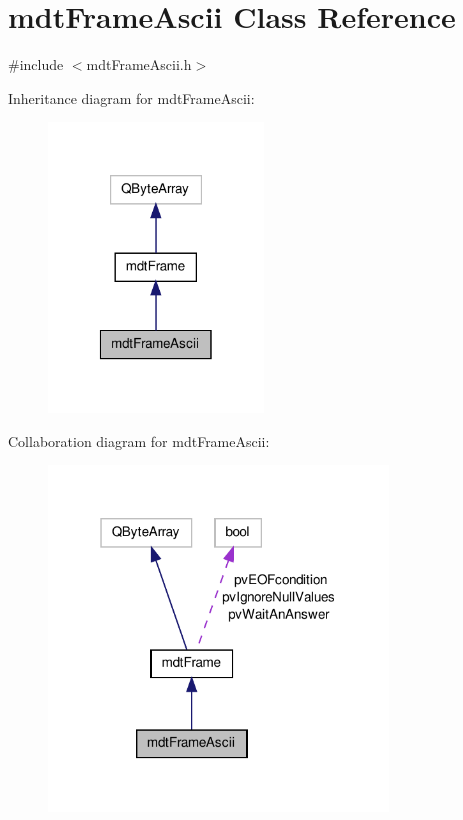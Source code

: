 \hypertarget{classmdt_frame_ascii}{\section{mdt\-Frame\-Ascii Class Reference}
\label{classmdt_frame_ascii}
}


{\ttfamily \#include $<$mdt\-Frame\-Ascii.\-h$>$}



Inheritance diagram for mdt\-Frame\-Ascii\-:\nopagebreak
\begin{figure}[H]
\begin{center}
\leavevmode
\includegraphics[width=162pt]{classmdt_frame_ascii__inherit__graph}
\end{center}
\end{figure}


Collaboration diagram for mdt\-Frame\-Ascii\-:\nopagebreak
\begin{figure}[H]
\begin{center}
\leavevmode
\includegraphics[width=256pt]{classmdt_frame_ascii__coll__graph}
\end{center}
\end{figure}
